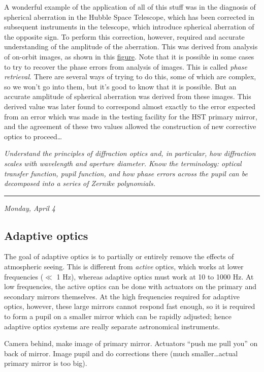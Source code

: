 \documentclass[12pt]{article}
\newcommand{\mynotes}[1]{\textcolor{myBlue}{#1}}
\newcommand{\test}[1]{%
    \begin{center}
        {\parbox{0.9\textwidth}{\textit{\small#1}}}
    \end{center}}
\newcommand{\mydate}[1]{
    \begin{flushright}
        \rule{\textwidth}{0.4pt} %
        \small\hfill\textit{#1}
    \end{flushright}}
\begin{document}
A wonderful example of the application of all of this stuff was in the
diagnosis of spherical aberration in the Hubble Space Telescope, which has been
corrected in subsequent instruments in the telescope, which introduce spherical
aberration of the opposite sign. To perform this correction, however, required
and accurate understanding of the amplitude of the aberration. This was derived
from analysis of on-orbit images, as shown in this \href{http://astronomy.nmsu.edu/holtz/a535/html/diagrams/a535/hstspher.htm}
{figure}. Note that it is possible in some cases to try to recover the phase
errors from analysis of images. This is called \textit{phase retrieval}. There
are several ways of trying to do this, some of which are complex, so we won't
go into them, but it's good to know that it is possible. But an accurate
amplitude of spherical aberration was derived from these images. This derived
value was later found to correspond almost exactly to the error expected from
an error which was made in the testing facility for the HST primary mirror, and
the agreement of these two values allowed the construction of new corrective
optics to proceed\ldots

\test{Understand the principles of diffraction optics and, in particular,
how diffraction scales with wavelength and aperture diameter. Know the
terminology: optical transfer function, pupil function, and how phase
errors across the pupil can be decomposed into a series of Zernike polynomials.}

\mydate{Monday, April 4}
\subsection{Adaptive optics}
The goal of adaptive optics is to partially or entirely remove the effects of
atmospheric seeing. This is different from \textit{active} optics, which works
at lower frequencies ($\ll$ 1 Hz), whereas adaptive optics must work at 10 to
1000 Hz.  At low frequencies, the active optics can be done with actuators on
the primary and secondary mirrors themselves.  At the high frequencies required
for adaptive optics, however, these large mirrors cannot respond fast enough,
so it is required to form a pupil on a smaller mirror which can be rapidly
adjusted; hence adaptive optics systems are really separate astronomical
instruments.

\mynotes{Camera behind, make image of primary mirror.
Actuators ``push me pull you'' on back of mirror.
Image pupil and do corrections there (much smaller\ldots actual
primary mirror is too big).}
\end{document}
